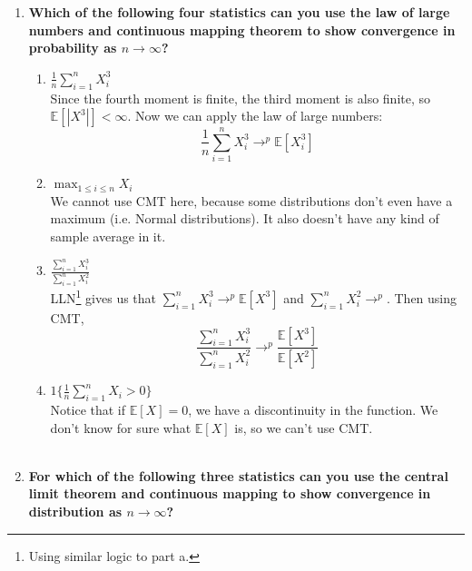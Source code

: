 \documentclass[]{article}
\newcommand{\sumin}{\sum\limits_{i=1}^n} %
\newcommand{\E}{\mathbb{E}}
\newcommand{\fix} [1] {\textbf{\textcolor{blue}{#1}}} %
\begin{document}
\begin{enumerate}[label = (\roman*)]


\item \textbf{Which of the following four statistics can you use the law of large numbers and continuous mapping theorem to show convergence in probability as $n \rightarrow \infty$?}

\begin{enumerate}[label = (\alph*)]

\item  $\frac{1}{n}\sumin X_i^3$ \\
Since the fourth moment is finite, the third moment is also finite, so $\E[|X^3|] <\infty$. Now we can apply the law of large numbers:
\[\frac{1}{n}\sumin X_i^3 \rightarrow^p \E[X_i^3] \]

\item $\max_{1\le i \le n} X_i$ \\
We cannot use CMT here, because some distributions don't even have a maximum (i.e. Normal distributions). It also doesn't have any kind of sample average in it. 

\item $ \frac{\sumin X_i^3}{\sumin X_i^2}$ \\
LLN\footnote{Using similar logic to part a.} gives us that $\sumin X_i^3 \rightarrow^p \E[X^3]$ and $ \sumin X_i^2 \rightarrow^p$. Then using CMT, 
\[\frac{\sumin X_i^3}{\sumin X_i^2} \rightarrow^p \frac{\E[X^3]}{\E[X^2]}\]

\item $ 1 \bigg\{\frac{1}{n}\sumin X_i > 0\bigg\}$ \\
Notice that if $\E[X] = 0$, we have a discontinuity in the function. We don't know for sure what $\E[X]$ is, so we can't use CMT. 
\\\\



\end{enumerate}


\item \textbf{For which of the following three statistics can you use the central limit theorem and continuous mapping to show convergence in distribution as $n \rightarrow \infty$?}


\end{enumerate}
\end{document}
